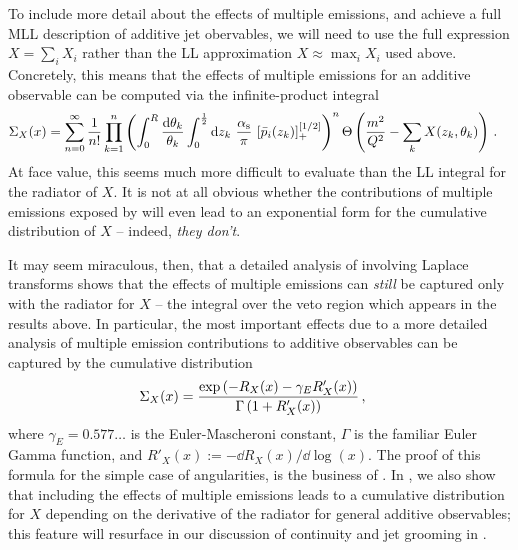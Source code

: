 To include more detail about the effects of multiple emissions, and achieve a full MLL description of additive jet obervables, we will need to use the full expression \(X = \sum_i X_i\) rather than the LL approximation \(X \approx \max_i X_i\) used above.
%
Concretely, this means that the effects of multiple emissions for an additive observable can be computed via the infinite-product integral
\begin{align}
    \label{eq:series-multiple-emissions}
    \Sigma_X(x)
    &=
    \sum_{n = 0}^{\infty}
    \frac{1}{n!}
    \prod_{k = 1}^n
    \left(
        \int_0^R \frac{\dd\theta_k}{\theta_k}
        \int_0^{\frac{1}{2}} \dd z_k
        \,\,
        \frac{\alphas}{\pi}
        \,\,
        [\bar{p}_i(z_k)]_+^{[1/2]}
    \right)^n
    \Theta\left(
        \frac{m^2}{Q^2} - \sum_k X(z_k, \theta_k)
    \right)
    \,.
\end{align}
%
At face value, this seems much more difficult to evaluate than the LL integral for the radiator of \(X\).
%
It is not at all obvious whether the contributions of multiple emissions exposed by  will even lead to an exponential form for the cumulative distribution of \(X\) --
indeed, \textit{they don't}.

It may seem miraculous, then, that a detailed analysis of  involving Laplace transforms shows that the effects of multiple emissions can \textit{still} be captured only with the radiator for \(X\) -- the integral over the veto region which appears in the  results above.
%
In particular, the most important effects due to a more detailed analysis of multiple emission contributions to additive observables can be captured by the cumulative distribution
\begin{align}
    \label{eq:resummed-multiple-emissions}
    \Sigma_X(x)
    &=
    \frac{\exp\le(-R_X(x) - \gamma_E R'_X(x)\ri)}{\Gamma\le(1 + R'_X(x)\ri)}
    \,,
\end{align}
where \(\gamma_E=0.577\dots\) is the Euler-Mascheroni constant, \(\Gamma\) is the familiar Euler Gamma function, and \(R'_X(x) := -\dd R_X(x) / \dd \log(x)\).
%
The proof of this formula for the simple case of angularities, is the business of .
%
In , we also show that including the effects of multiple emissions leads to a cumulative distribution for \(X\) depending on the derivative of the radiator for general additive observables;
%
this feature will resurface in our discussion of continuity and jet grooming in .




